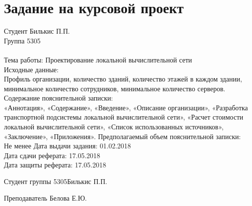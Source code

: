 \documentclass[a4paper,14pt,russian]{article}
\newcommand{\theme}{Проектирование локальной вычислительной сети}
\newcommand{\groupnumber}{5305}
\newcommand{\studentname}{Билькис П.П.}
\newcommand{\teachername}{Белова Е.Ю.}
\begin{document}


\section*{Задание на курсовой проект}

Студент \studentname\\
Группа \groupnumber\\\\
Тема работы: \theme\\
Исходные данные:\\
Профиль организации, количество зданий, количество этажей в каждом здании, минимальное количество сотрудников, минимальное количество серверов.
Содержание пояснительной записки:\\
«Аннотация», «Содержание», «Введение», «Описание организации», «Разработка транспортной подсистемы локальной вычислительной сети», «Расчет стоимости локальной вычислительной сети», «Список использованных источников», «Заключение», «Приложения».
Предполагаемый объем пояснительной записки:\\
Не менее \pageref{LastPage}
Дата выдачи задания: 01.02.2018\\
Дата сдачи реферата: 17.05.2018\\
Дата защиты реферата: 17.05.2018\\

\vfill


Студент группы \groupnumber \hfill \studentname


Преподаватель \hfill \teachername


\clearpage

\begin{abstract}
В курсовом проекте необходимо выполнить проектирование локальной вычислительной сети производства одежды. В первой части проекта приведено описание функций и структуры производства, направлений работы его подразделений. Вторая часть проекта включает в себя разработку транспортной подсистемы локальной вычислительной сети производства одежды. В третьей части проекта выполнена оценка стоимости локальной вычислительной сети и её дальнейшая эксплуатация, выдвинуты требования к составу обслуживающего персонала.
\end{abstract}


\begin{abstract}
In this coursework local computer network for the clothes manufacture is described. The first section presented basic stucture \& functions of the manufacture, it's subdivisions and their responsibilities are depicted. The second, however, describes transport sub-system of the local computer network. The third section contains of cost estimations for bulding and supporting this local computer network, and staff requirements.
\end{abstract}
\end{document}
